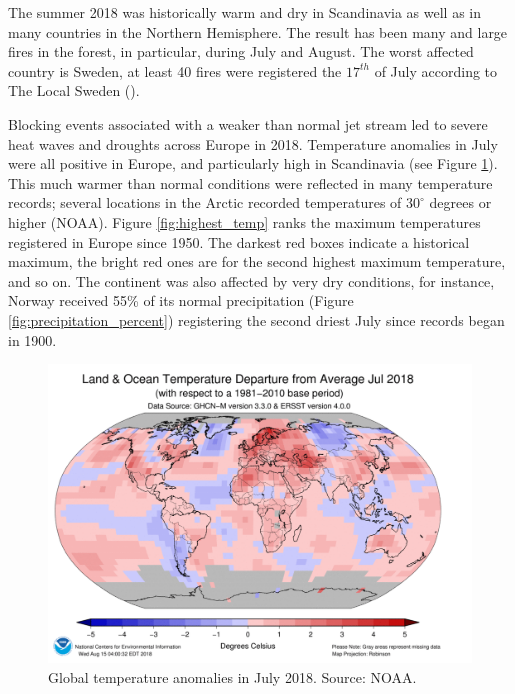 \documentclass[a4paper, article, oneside, UKenglish]{memoir}
\newcommand{\0}{\mathbf{0}}
\newcommand{\1}{\mathbf{1}}
\begin{document}
The summer 2018 was historically warm and dry in Scandinavia as well as in many countries in the Northern Hemisphere. The result has been many and large fires in the forest, in particular, during July and August. The worst affected country is Sweden, at least 40 fires were registered the $17^{th}$ of July according to The Local Sweden (\cite{the_local_sweden}).

Blocking events associated with a weaker than normal jet stream led to severe heat waves and droughts across Europe in 2018. Temperature anomalies in July were all positive in Europe, and particularly high in Scandinavia (see Figure \ref{fig:temperature_anomalies}). This much warmer than normal conditions were reflected in many temperature records; several locations in the Arctic recorded temperatures of $30^{\circ}$ degrees or higher (NOAA). Figure \ref{fig:highest_temp} ranks the maximum temperatures registered in Europe since 1950. The darkest red boxes indicate a historical maximum, the bright red ones are for the second highest maximum temperature, and so on. The continent was also affected by very dry conditions, for instance, Norway received 55\% of its normal precipitation (Figure \ref{fig:precipitation_percent}) registering the second driest July since records began in 1900.

\begin{figure}
    \centering
    \includegraphics[scale=0.3]{NOAA/warm_anomalies.png}
    \caption{Global temperature anomalies in July 2018. Source: NOAA.}
    \label{fig:temperature_anomalies}
\end{figure}
\end{document}
